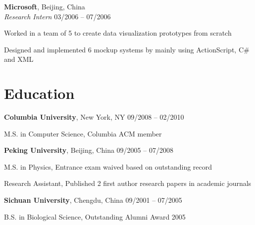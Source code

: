 \documentclass[margin,line]{resume}
\begin{document}
\begin{resume}
    \textbf{Microsoft}, Beijing, China \\
    \textsl{Research Intern} \hfill 03/2006 -- 07/2006 \vspace{-3mm}\\\vspace{-1mm}%
      \begin{list2}
      \item Worked in a team of 5 to create data visualization prototypes from scratch
      \item Designed and implemented 6 mockup systems by mainly using ActionScript, C\# and XML
      \end{list2}

    \section{\mysidestyle Education}

    \textbf{Columbia University}, New York, NY \hfill 09/2008 -- 02/2010 \vspace{-3mm}\\\vspace{-1mm}%
      \begin{list2}
       \item M.S. in Computer Science, Columbia ACM member
      \end{list2}
 

    \textbf{Peking University}, Beijing, China \hfill 09/2005 -- 07/2008 \vspace{-3mm}\\\vspace{-1mm}%
      \begin{list2}
       \item M.S. in Physics, Entrance exam waived based on outstanding record
       \item Research Assistant, Published 2 first author research papers in academic journals
      \end{list2}
    
    \textbf{Sichuan University}, Chengdu, China \hfill 09/2001 -- 07/2005 \vspace{-3mm}\\\vspace{-1mm}%
      \begin{list2}
       \item B.S. in Biological Science, Outstanding Alumni Award 2005
      \end{list2}


\end{resume}
\end{document}

